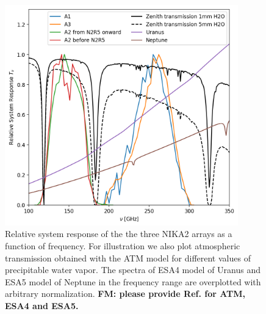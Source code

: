 

\begin{figure}[ht] %
\begin{center}
\includegraphics[width=0.9\textwidth]{Figures/SpectralBands/bandpasses_nika2.png}
\caption{Relative system response of the the three NIKA2 arrays as a
  function of frequency. For illustration we also plot atmospheric transmission obtained with the ATM model 
  for different values of precipitable water vapor. The spectra of ESA4 model of Uranus and ESA5 model of
  Neptune in the frequency range are overplotted with arbitrary
  normalization. {\bf FM: please provide Ref. for ATM, ESA4 and ESA5.}}
 \label{spectralband1}
\end{center}
\end{figure}


